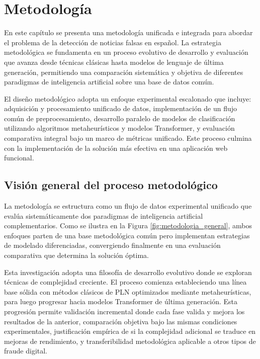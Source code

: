 \chapter{Metodología \label{cap:Metodologia}}

En este capítulo se presenta una metodología unificada e integrada para abordar el problema de la detección de noticias falsas en español. La estrategia metodológica se fundamenta en un proceso evolutivo de desarrollo y evaluación que avanza desde técnicas clásicas hasta modelos de lenguaje de última generación, permitiendo una comparación sistemática y objetiva de diferentes paradigmas de inteligencia artificial sobre una base de datos común.

El diseño metodológico adopta un enfoque experimental escalonado que incluye: adquisición y procesamiento unificado de datos, implementación de un flujo común de preprocesamiento, desarrollo paralelo de modelos de clasificación utilizando algoritmos metaheurísticos y modelos Transformer, y evaluación comparativa integral bajo un marco de métricas unificado. Este proceso culmina con la implementación de la solución más efectiva en una aplicación web funcional.

\section{Visión general del proceso metodológico}

La metodología se estructura como un flujo de datos experimental unificado que evalúa sistemáticamente dos paradigmas de inteligencia artificial complementarios. Como se ilustra en la Figura \ref{fig:metodologia_general}, ambos enfoques parten de una base metodológica común pero implementan estrategias de modelado diferenciadas, convergiendo finalmente en una evaluación comparativa que determina la solución óptima.

Esta investigación adopta una filosofía de desarrollo evolutivo donde se exploran técnicas de complejidad creciente. El proceso comienza estableciendo una línea base sólida con métodos clásicos de PLN optimizados mediante metaheurísticas, para luego progresar hacia modelos Transformer de última generación. Esta progresión permite validación incremental donde cada fase valida y mejora los resultados de la anterior, comparación objetiva bajo las mismas condiciones experimentales, justificación empírica de si la complejidad adicional se traduce en mejoras de rendimiento, y transferibilidad metodológica aplicable a otros tipos de fraude digital.

